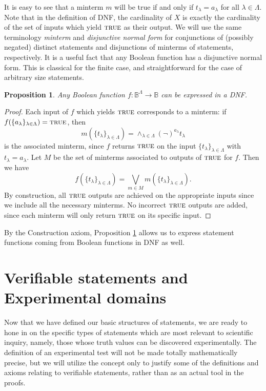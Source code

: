 \documentclass[psamsfonts]{amsart}
\newtheorem{prop}[thm]{Proposition}
\theoremstyle{definition}
\theoremstyle{remark}
\numberwithin{equation}{section}
\def\TRUE{\textsc{true}}
\def\AND{\wedge}
\def\bigOR{\bigvee}
\def\NOT{\neg}
\begin{document}
It is easy to see that a minterm $m$ will be true if and only if $t_{\lambda}=a_{\lambda}$ for all $\lambda\in\Lambda$. Note that in the definition of DNF, the cardinality of $X$ is exactly the cardinality of the set of inputs which yield $\TRUE$ as their output. We will use the same terminology \emph{minterm} and \emph{disjunctive normal form} for conjunctions of (possibly negated) distinct statements and disjunctions of minterms of statements, respectively. It is a useful fact that any Boolean function has a disjunctive normal form. This is classical for the finite case, and straightforward for the case of arbitrary size statements.

\begin{prop}\label{prop_dnf}
Any Boolean function $f:\mathbb{B}^{\Lambda}\to\mathbb{B}$ can be expressed in a DNF. 
\end{prop}
\begin{proof}
Each input of $f$ which yields $\TRUE$ corresponds to a minterm: if $f(\{a_{\lambda}\}_{\lambda\in\Lambda})=\TRUE$, then $$m(\{t_{\lambda}\}_{\lambda\in\Lambda}) = \AND_{\lambda\in\Lambda}(\NOT)^{a_{\lambda}}t_{\lambda}$$ is the associated minterm, since $f$ returns $\TRUE$ on the input $\{t_{\lambda}\}_{\lambda\in\Lambda}$ with $t_{\lambda}=a_{\lambda}$. Let $M$ be the set of minterms associated to outputs of $\TRUE$ for $f$. Then we have
$$
f(\{t_{\lambda}\}_{\lambda\in\Lambda}) = \bigOR\limits_{m\in M}m(\{t_{\lambda}\}_{\lambda\in\Lambda}).
$$
By construction, all $\TRUE$ outputs are achieved on the appropriate inputs since we include all the necessary minterms. No incorrect $\TRUE$ outputs are added, since each minterm will only return $\TRUE$ on its specific input. 
\end{proof}

By the Construction axiom, Proposition \ref{prop_dnf} allows us to express statement functions coming from Boolean functions in DNF as well. 

\section{Verifiable statements and Experimental domains}
\label{verifiable}
Now that we have defined our basic structures of statements, we are ready to hone in on the specific types of statements which are most relevant to scientific inquiry, namely, those whose truth values can be discovered experimentally. The definition of an experimental test will not be made totally mathematically precise, but we will utilize the concept only to justify some of the definitions and axioms relating to verifiable statements, rather than as an actual tool in the proofs. 
\end{document}
